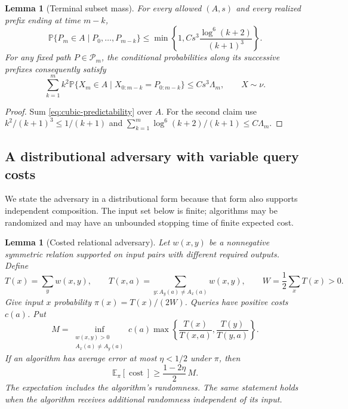 \documentclass[11pt,a4paper]{article}
\newcommand{\E}{\mathbb E}
\newcommand{\Prb}{\mathbb P}
\newtheorem{lemma}[theorem]{Lemma}
\theoremstyle{definition}
\theoremstyle{remark}
\begin{document}
\begin{lemma}[Terminal subset mass]
\label{lem:subset-mass}
For every allowed $(A,s)$ and every realized prefix ending at time $m-k$,
\[
 \Prb\{P_m\in A\mid P_0,\ldots,P_{m-k}\}
 \le \min\left\{1,
 C s^3\frac{\log^6(k+2)}{(k+1)^3}\right\}.
\]
For any fixed path $P\in\mathcal P_m$, the conditional probabilities along
its successive prefixes consequently satisfy
\[
 \sum_{k=1}^m k^2
 \Prb\{X_m\in A\mid X_{0:m-k}=P_{0:m-k}\}
 \le C s^3\Lambda_m,\qquad X\sim\nu.
\]
\end{lemma}

\begin{proof}
Sum \eqref{eq:cubic-predictability} over $A$.  For the second claim use
$k^2/(k+1)^3\le1/(k+1)$ and
$\sum_{k=1}^m\log^6(k+2)/(k+1)\le C\Lambda_m$.
\end{proof}

\subsection{A distributional adversary with variable query costs}

We state the adversary in a distributional form because that form also
supports independent composition.  The input set below is finite; algorithms
may be randomized and may have an unbounded stopping time of finite expected
cost.

\begin{lemma}[Costed relational adversary]
\label{lem:costed-adversary}
Let $w(x,y)$ be a nonnegative symmetric relation supported on input pairs
with different required outputs.  Define
\[
 T(x)=\sum_y w(x,y),\qquad
 T(x,a)=\sum_{y:A_y(a)\ne A_x(a)}w(x,y),
 \qquad W=\frac12\sum_xT(x)>0.
\]
Give input $x$ probability $\pi(x)=T(x)/(2W)$.  Queries have positive costs
$c(a)$.  Put
\[
 M=\inf_{\substack{w(x,y)>0\\A_x(a)\ne A_y(a)}}
 c(a)\max\left\{\frac{T(x)}{T(x,a)},
                 \frac{T(y)}{T(y,a)}\right\}.
\]
If an algorithm has average error at most $\eta<1/2$ under $\pi$, then
\begin{equation}
 \E_{\pi}[\operatorname{cost}]
 \ge \frac{1-2\eta}{2}\,M.
 \label{eq:robust-adversary}
\end{equation}
The expectation includes the algorithm's randomness.  The same statement
holds when the algorithm receives additional randomness independent of its
input.
\end{lemma}
\end{document}
